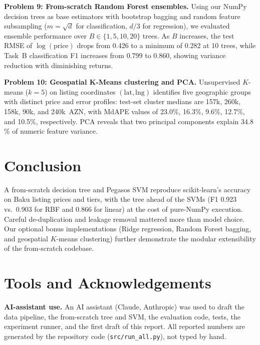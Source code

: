 \documentclass[10pt,twocolumn,a4paper]{article}
\begin{document}
\textbf{Problem 9: From-scratch Random Forest ensembles.}
Using our NumPy decision trees as base estimators with bootstrap bagging and random feature subsampling ($m = \sqrt{d}$ for classification, $d/3$ for regression), we evaluated ensemble performance over $B \in \{1, 5, 10, 20\}$ trees. As $B$ increases, the test RMSE of $\log(\text{price})$ drops from 0.426 to a minimum of 0.282 at 10 trees, while Task~B classification F1 increases from 0.799 to 0.860, showing variance reduction with diminishing returns.

\textbf{Problem 10: Geospatial K-Means clustering and PCA.}
Unsupervised $K$-means ($k=5$) on listing coordinates $(\text{lat}, \text{lng})$ identifies five geographic groups with distinct price and error profiles: test-set cluster medians are 157k, 260k, 158k, 90k, and 240k~AZN, with MdAPE values of 23.0\%, 16.3\%, 9.6\%, 12.7\%, and 10.5\%, respectively. PCA reveals that two principal components explain 34.8\,\% of numeric feature variance.

\balance
\section{Conclusion}
A from-scratch decision tree and Pegasos SVM reproduce scikit-learn's accuracy on Baku listing prices and tiers, with the tree ahead of the SVMs (F1 0.923 vs.\ 0.903 for RBF and 0.866 for linear) at the cost of pure-NumPy execution.
Careful de-duplication and leakage removal mattered more than model choice. Our optional bonus implementations (Ridge regression, Random Forest bagging, and geospatial $K$-means clustering) further demonstrate the modular extensibility of the from-scratch codebase.

\section*{Tools and Acknowledgements}
\textbf{AI-assistant use.} An AI assistant (Claude, Anthropic) was used to draft the data pipeline, the from-scratch tree and SVM, the evaluation code, tests, the experiment runner, and the first draft of this report. All reported numbers are generated by the repository code (\texttt{src/run\_all.py}), not typed by hand.
\end{document}
